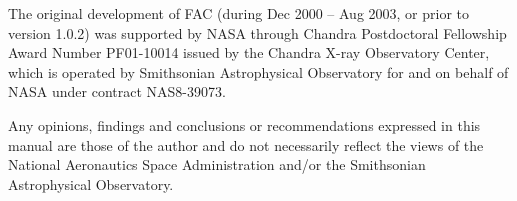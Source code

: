 The original development of FAC (during Dec 2000 -- Aug 2003, or prior to
version 1.0.2) was supported by NASA through Chandra Postdoctoral Fellowship
Award Number PF01-10014 issued by the Chandra X-ray Observatory Center, which is
operated by Smithsonian Astrophysical Observatory for and on behalf of NASA
under contract NAS8-39073.

Any opinions, findings and conclusions or recommendations expressed in this
manual are those of the author and do not necessarily reflect the views of the
National Aeronautics Space Administration and/or the Smithsonian Astrophysical
Observatory.
